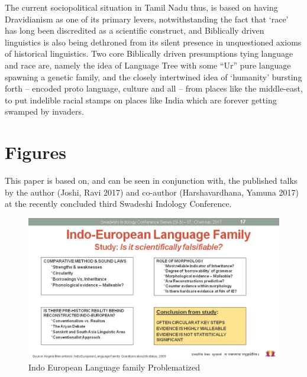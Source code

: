 The current sociopolitical situation in Tamil Nadu thus, is based on having Dravidianism as one of its primary levers, notwithstanding the fact that ‘race’ has long been discredited as a scientific construct, and Biblically driven linguistics is also being dethroned from its silent presence in unquestioned axioms of historical linguistics. Two core Biblically driven presumptions tying language and race are, namely the idea of Language Tree with some “Ur” pure language spawning a genetic family, and the closely intertwined idea of ‘humanity’ bursting forth – encoded proto language, culture and all – from places like the middle-east, to put indelible racial stamps on places like India which are forever getting swamped by invaders.


\section*{Figures}

\vskip -7pt

This paper is based on, and can be seen in conjunction with, the published talks by the author (Joshi, Ravi 2017) and co-author (Harshavardhana, Yamuna 2017) at the recently concluded third Swadeshi Indology Conference.

\vskip 4pt

\begin{figure}[!hbp]
\includegraphics[scale=0.29]{images/article-02/art02-fig01.jpg}
\caption{Indo European Language family Problematized}\label{art2-fig01}
\end{figure}

\newpage

